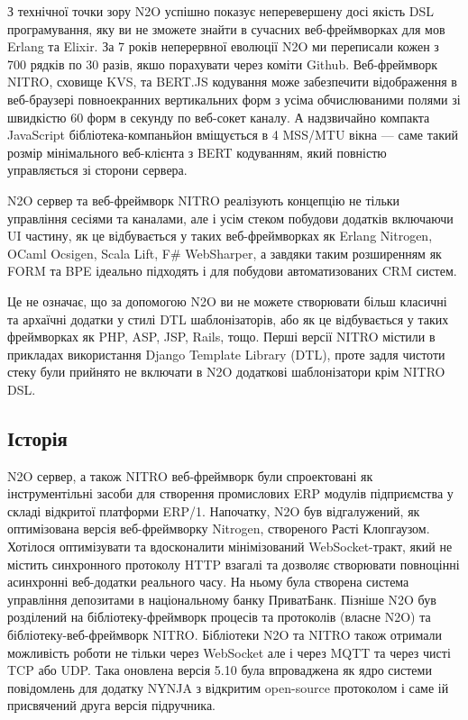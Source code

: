 З технічної точки зору N2O успішно показує неперевершену досі якість
DSL програмування, яку ви не зможете знайти в сучасних веб-фреймворках
для мов Erlang та Elixir. За 7 років неперервної еволюції N2O ми переписали
кожен з 700 рядків по 30 разів, якшо порахувати через коміти Github.
Веб-фреймворк NITRO, сховище KVS, та BERT.JS кодування може забезпечити
відображення в веб-браузері повноекранних вертикальних форм з усіма
обчислюваними полями зі швидкістю 60 форм в секунду по веб-сокет каналу.
А надзвичайно компакта JavaScript бібліотека-компаньйон вміщується
в 4 MSS/MTU вікна — саме такий розмір мінімального веб-клієнта з BERT
кодуванням, який повністю управляється зі сторони сервера.

N2O сервер та веб-фреймворк NITRO реалізують концепцію не тільки
управління сесіями та каналами, але і усім стеком побудови додатків
включаючи UI частину, як це відбувається у таких веб-фреймворках як
Erlang Nitrogen, OCaml Ocsigen, Scala Lift, F# WebSharper, а завдяки
таким розширенням як FORM та BPE ідеально підходять і для побудови
автоматизованих CRM систем.

Це не означає, що за допомогою N2O ви не можете створювати більш
класичні та архаїчні додатки у стилі DTL шаблонізаторів, або як це
відбувається у таких фреймворках як PHP, ASP, JSP, Rails, тощо.
Перші версії NITRO містили в прикладах використання Django Template
Library (DTL), проте задля чистоти стеку були прийнято не включати
в N2O додаткові шаблонізатори крім NITRO DSL.

\subsection{Історія}

N2O сервер, а також NITRO веб-фреймворк були спроектовані як інструментільні засоби
для створення промислових ERP модулів підприємства у складі відкритої платформи ERP/1.
Напочатку, N2O був відгалужений, як оптимізована версія веб-фреймворку Nitrogen,
створеного Расті Клопгаузом. Хотілося оптимізувати та вдосконалити мінімізований
WebSocket-тракт, який не містить синхронного протоколу HTTP взагалі та дозволяє
створювати повноцінні асинхронні веб-додатки реального часу. На ньому була створена
система управління депозитами в національному банку ПриватБанк. Пізніше N2O був розділений
на бібліотеку-фреймворк процесів та протоколів (власне N2O) та бібліотеку-веб-фреймворк NITRO.
Бібліотеки N2O та NITRO також отримали можливість роботи не тільки через WebSocket але і
через MQTT та через чисті TCP або UDP. Така оновлена версія 5.10 була впроваджена як ядро
системи повідомлень для додатку NYNJA з відкритим open-source протоколом і саме ій
присвячений друга версія підручника.

